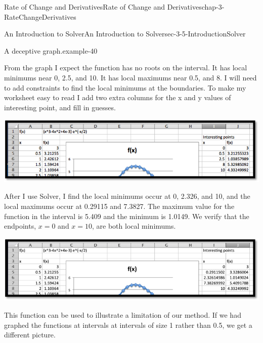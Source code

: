 \documentclass[oneside,10pt,]{book}
\numberwithin{equation}{section}
\begin{document}
\begin{chapterptx}{Rate of Change and Derivatives}{}{Rate of Change and Derivatives}{}{}{chap-3-RateChangeDerivatives}
\begin{sectionptx}{An Introduction to Solver}{}{An Introduction to Solver}{}{}{sec-3-5-IntroductionSolver}
\begin{example}{A deceptive graph.}{example-40}
\begin{sidebyside}{1}{0.15}{0.15}{0}
\begin{sbspanel}{0.7}
\end{sbspanel}%
\end{sidebyside}%
\par
\hypertarget{p-1345}{}%
From the graph I expect the function has no roots on the interval.  It has local minimums near 0, 2.5, and 10.  It has local maximums near 0.5, and 8.  I will need to add constraints to find the local minimums at the boundaries.  To make my worksheet easy to read I add two extra columns for the x and y values of interesting point, and fill in guesses.%
\begin{sidebyside}{1}{0}{0}{0}%
\begin{sbspanel}{1}%
\includegraphics[width=1\linewidth]{images/sec3-5-10.png}
\end{sbspanel}%
\end{sidebyside}%
\par
\hypertarget{p-1346}{}%
After I use Solver, I find the local minimums occur at 0, 2.326, and 10, and the local maximums occur at 0.29115 and 7.3827.  The maximum value for the function in the interval is 5.409 and the minimum is 1.0149.  We verify that the endpoints, \(x=0\) and \(x=10\), are both local minimums.%
\begin{sidebyside}{1}{0}{0}{0}%
\begin{sbspanel}{1}%
\includegraphics[width=1\linewidth]{images/sec3-5-11.png}
\end{sbspanel}%
\end{sidebyside}%
\par
\hypertarget{p-1347}{}%
This function can be used to illustrate a limitation of our method.  If we had graphed the functions at intervals at intervals of size 1 rather than 0.5, we get a different picture.%
\begin{sidebyside}{1}{0}{0}{0}%
\begin{sbspanel}{1}%

\end{sbspanel}
\end{sidebyside}
\end{example}
\end{sectionptx}
\end{chapterptx}
\end{document}
